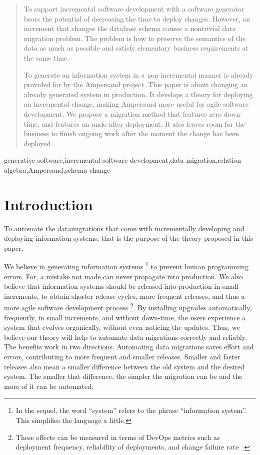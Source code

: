 \documentclass{elsarticle}
\begin{document}
\begin{abstract}
   To support incremental software development with a software generator bears the potential of decreasing the time to deploy changes.
   However, an increment that changes the database schema causes a nontrivial data migration problem.
   The problem is how to preserve the semantics of the data as much as possible and satisfy elementary business requirements at the same time.

   To generate an information system in a non-incremental manner is already
   provided for by the Ampersand project.
   This paper is about changing an already generated system in production.
   It develops a theory for deploying an incremental change,
   making Ampersand more useful for agile software development.
   We propose a migration method that features zero down-time,
   and features an undo after deployment.
   It also leaves room for the business to finish ongoing work
   after the moment the change has been deployed.
\end{abstract}

\begin{keyword}
generative software\sep incremental software development\sep data migration\sep relation algebra\sep Ampersand\sep schema change
\end{keyword}
\maketitle

\section{Introduction}
\label{sct:Introduction}
   To automate the datamigrations that come with incrementally developing and deploying information systems;
   that is the purpose of the theory proposed in this paper.

   We believe in generating information systems%
\footnote{In the sequel, the word ``system'' refers to the phrase ``information system''. This simplifies the language a little. }
   to prevent human programming errors.
   For, a mistake not made can never propagate into production.
   We also believe that information systems should be released into production in small increments,
   to obtain shorter release cycles, more frequent releases, and thus a more agile software development process%
   \footnote{These effects can be measured in terms of DevOps metrics such as
   deployment frequency,
   reliability of deployments, and
   change failure rate~\cite{DevOps2021}.}.
   By installing upgrades automatically, frequently, in small increments, and without down-time,
   the users experience a system that evolves organically, without even noticing the updates.
   Thus, we believe our theory will help to automate data migrations correctly and reliably.
   The benefits work in two directions.
   Automating data migrations saves effort and errors,
   contributing to more frequent and smaller releases.
   Smaller and faster releases also mean a smaller difference between the old system and the desired system.
   The smaller that difference, the simpler the migration can be and the more of it can be automated.
\end{document}
